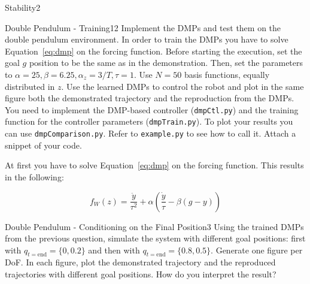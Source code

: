 \begin{questions}
\begin{question}{Stability}{2}
\end{question}


\begin{question}{Double Pendulum - Training}{12}
Implement the DMPs and test them on the double pendulum environment.
In order to train the DMPs you have to solve Equation~\eqref{eq:dmp} on the forcing function. Before starting the execution, set the goal $g$ position to be the same as in the demonstration. Then, set the parameters to $\alpha=25, \beta=6.25, \alpha_z=3/T, \tau=1$. Use $N=50$ basis functions, equally distributed in $z$.  Use the learned DMPs to control the robot and plot in the same figure both the demonstrated trajectory and the reproduction from the DMPs.
You need to implement the DMP-based controller (\texttt{dmpCtl.py}) and the training function for the controller parameters (\texttt{dmpTrain.py}). To plot your results you can use \texttt{dmpComparison.py}. Refer to \texttt{example.py} to see how to call it. Attach a snippet of your code.

\begin{answer}
At first you have to solve Equation~\eqref{eq:dmp} on the forcing function. This results in the following:

\begin{equation}
	f_W(z) = \frac{\ddot{y}}{\tau^2}+\alpha (\frac{\dot{y}}{\tau} - \beta (g-y))
\end{equation}

\end{answer}

\end{question}




\begin{question}{Double Pendulum - Conditioning on the Final Position}{3}
Using the trained DMPs from the previous question, simulate the system with different goal positions: first with $q_{t=\mathrm{end}} = \{0, 0.2\}$ and then with $q_{t=\mathrm{end}} = \{0.8, 0.5\}$. Generate one figure per DoF. In each figure, plot the demonstrated trajectory and the reproduced trajectories with different goal positions.
How do you interpret the result? 

\begin{answer}\end{answer}


\end{question}


\end{questions}
